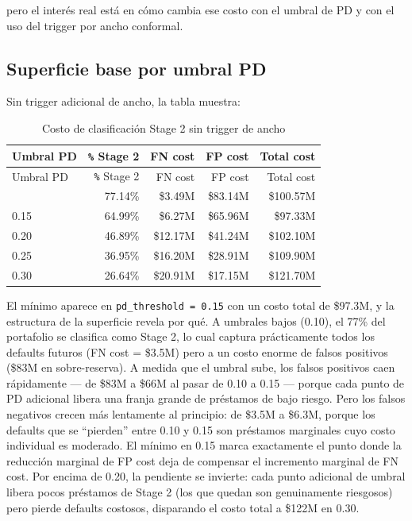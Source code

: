 \documentclass[
  spanish,
  11pt,
  letterpaper,
]{scrbook}
\theoremstyle{plain}
\theoremstyle{remark}
\begin{document}
pero el interés real está en cómo cambia ese costo con el umbral de PD y
con el uso del trigger por ancho conformal.

\subsection{Superficie base por umbral
PD}\label{superficie-base-por-umbral-pd}

Sin trigger adicional de ancho, la tabla muestra:

\begin{longtable}[]{@{}lrrrr@{}}
\caption{Costo de clasificación Stage 2 sin trigger de
ancho}\label{tbl-stage-cost}\tabularnewline
\toprule\noalign{}
Umbral PD & \texttt{\%} Stage 2 & FN cost & FP cost & Total cost \\
\midrule\noalign{}
\endfirsthead
\toprule\noalign{}
Umbral PD & \texttt{\%} Stage 2 & FN cost & FP cost & Total cost \\
\midrule\noalign{}
\endhead
\bottomrule\noalign{}
\endlastfoot
0.10 & 77.14\% & \$3.49M & \$83.14M & \$100.57M \\
0.15 & 64.99\% & \$6.27M & \$65.96M & \$97.33M \\
0.20 & 46.89\% & \$12.17M & \$41.24M & \$102.10M \\
0.25 & 36.95\% & \$16.20M & \$28.91M & \$109.90M \\
0.30 & 26.64\% & \$20.91M & \$17.15M & \$121.70M \\
\end{longtable}

El mínimo aparece en \texttt{pd\_threshold\ =\ 0.15} con un costo total
de \$97.3M, y la estructura de la superficie revela por qué. A umbrales
bajos (0.10), el 77\% del portafolio se clasifica como Stage 2, lo cual
captura prácticamente todos los defaults futuros (FN cost = \$3.5M) pero
a un costo enorme de falsos positivos (\$83M en sobre-reserva). A medida
que el umbral sube, los falsos positivos caen rápidamente --- de \$83M a
\$66M al pasar de 0.10 a 0.15 --- porque cada punto de PD adicional
libera una franja grande de préstamos de bajo riesgo. Pero los falsos
negativos crecen más lentamente al principio: de \$3.5M a \$6.3M, porque
los defaults que se ``pierden'' entre 0.10 y 0.15 son préstamos
marginales cuyo costo individual es moderado. El mínimo en 0.15 marca
exactamente el punto donde la reducción marginal de FP cost deja de
compensar el incremento marginal de FN cost. Por encima de 0.20, la
pendiente se invierte: cada punto adicional de umbral libera pocos
préstamos de Stage 2 (los que quedan son genuinamente riesgosos) pero
pierde defaults costosos, disparando el costo total a \$122M en 0.30.
\end{document}
